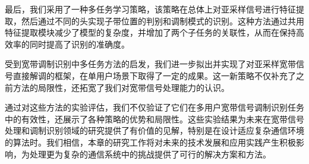 最后，我们采用了一种多任务学习策略，该策略在总体上对亚采样信号进行特征提取，然后通过不同的头实现子带位置的判别和调制模式的识别。这种方法通过共用特征提取模块减少了模型的复杂度，并增加了两个子任务的关联性，从而在保持高效率的同时提高了识别的准确度。

受到宽带调制识别中多任务方法的启发，我们进一步拟出并实现了对亚采样宽带信号直接解调的框架，在单用户场景下取得了一定的成果。这一新策略不仅补充了之前方法的局限性，还拓宽了我们对宽带信号处理能力的认识。

通过对这些方法的实验评估，我们不仅验证了它们在多用户宽带信号调制识别任务中的有效性，还展示了各种策略的优势和局限性。这些实验结果为未来在宽带信号处理和调制识别领域的研究提供了有价值的见解，特别是在设计适应复杂通信环境的算法时。我们相信，本章的研究工作将对未来的技术发展和应用实践产生积极影响，为处理更为复杂的通信系统中的挑战提供了可行的解决方案和方法。
